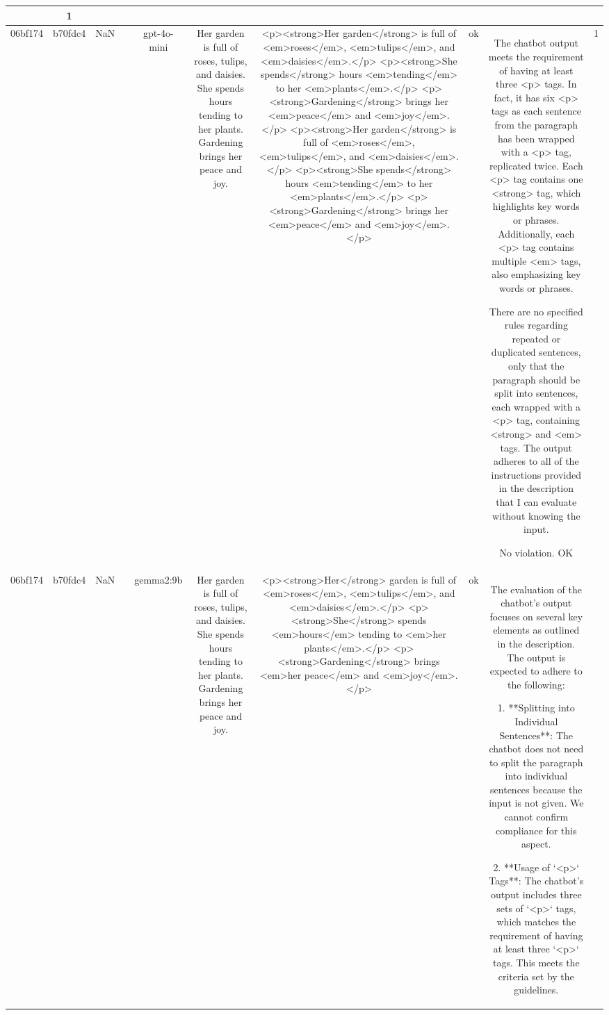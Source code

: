 \begin{table}[h!]
\begin{tabular}{|c|c|c|c|c|c|c|c|c|c|}
{{Based on these points, the output does not comply with the description provided.

ERR & 1\\
\hline
06bf174 & b70fdc4 & NaN &  & gpt-4o-mini & Her garden is full of roses, tulips, and daisies. She spends hours tending to her plants. Gardening brings her peace and joy. & <p><strong>Her garden</strong> is full of <em>roses</em>, <em>tulips</em>, and <em>daisies</em>.</p>
<p><strong>She spends</strong> hours <em>tending</em> to her <em>plants</em>.</p>
<p><strong>Gardening</strong> brings her <em>peace</em> and <em>joy</em>.</p>
<p><strong>Her garden</strong> is full of <em>roses</em>, <em>tulips</em>, and <em>daisies</em>.</p>
<p><strong>She spends</strong> hours <em>tending</em> to her <em>plants</em>.</p>
<p><strong>Gardening</strong> brings her <em>peace</em> and <em>joy</em>.</p> & ok & The chatbot output meets the requirement of having at least three <p> tags. In fact, it has six <p> tags as each sentence from the paragraph has been wrapped with a <p> tag, replicated twice. Each <p> tag contains one <strong> tag, which highlights key words or phrases. Additionally, each <p> tag contains multiple <em> tags, also emphasizing key words or phrases. 

There are no specified rules regarding repeated or duplicated sentences, only that the paragraph should be split into sentences, each wrapped with a <p> tag, containing <strong> and <em> tags. The output adheres to all of the instructions provided in the description that I can evaluate without knowing the input.

No violation.
OK & 1\\
\hline
06bf174 & b70fdc4 & NaN &  & gemma2:9b & Her garden is full of roses, tulips, and daisies. She spends hours tending to her plants. Gardening brings her peace and joy. & <p><strong>Her</strong> garden is full of <em>roses</em>, <em>tulips</em>, and <em>daisies</em>.</p>
<p><strong>She</strong> spends <em>hours</em> tending to <em>her plants</em>.</p>
<p><strong>Gardening</strong> brings <em>her peace</em> and <em>joy</em>.</p> 
 & ok & The evaluation of the chatbot's output focuses on several key elements as outlined in the description. The output is expected to adhere to the following:

1. **Splitting into Individual Sentences**: The chatbot does not need to split the paragraph into individual sentences because the input is not given. We cannot confirm compliance for this aspect.

2. **Usage of `<p>` Tags**: The chatbot's output includes three sets of `<p>` tags, which matches the requirement of having at least three `<p>` tags. This meets the criteria set by the guidelines.

}}
\end{tabular}
\end{table}

